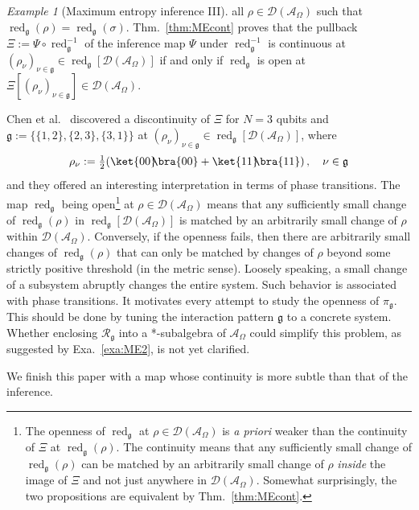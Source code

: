 \documentclass[a4paper,11pt,reqno]{amsart}
\newcommand{\cA}{\mathcal{A}}
\newcommand{\cD}{\mathcal{D}}
\newcommand{\cR}{\mathcal{R}}
\newcommand{\fg}{\mathfrak{g}}
\DeclareMathOperator\red{red}
\theoremstyle{definition}
\theoremstyle{remark}
\newtheorem{exa}[thm]{Example}
\numberwithin{equation}{section}
\begin{document}
\begin{exa}[Maximum entropy inference III]
all $\rho\in\cD(\cA_\Omega)$ such that $\red_\fg(\rho)=\red_\fg(\sigma)$. 
Thm.~\ref{thm:MEcont} proves that the pullback $\Xi:=\Psi\circ\red_\fg^{-1}$ 
of the inference map $\Psi$ under $\red_\fg^{-1}$ is continuous at 
$(\rho_\nu)_{\nu\in\fg}\in\red_\fg[\cD(\cA_\Omega)]$ if and only if 
$\red_\fg$ is open at $\Xi[(\rho_\nu)_{\nu\in\fg}]\in\cD(\cA_\Omega)$.
\par
%
Chen et al.~\cite[Ex.~4]{Chen-etal2015} discovered a discontinuity of $\Xi$ 
for $N=3$ qubits and $\fg:=\{\{1,2\},\{2,3\},\{3,1\}\}$ at 
$(\rho_\nu)_{\nu\in\fg}\in\red_\fg[\cD(\cA_\Omega)]$, where 
\[\textstyle
\rho_\nu:=\frac{1}{2}(\ket{00}\!\!\bra{00}+\ket{11}\!\!\bra{11})\,,
\quad 
\nu\in\fg
\]
and they offered an interesting interpretation in terms of phase transitions. 
The map $\red_\fg$ being open\footnote{%
%
The openness of $\red_\fg$ at $\rho\in\cD(\cA_\Omega)$ is \emph{a priori} 
weaker than the continuity of $\Xi$ at $\red_\fg(\rho)$. The 
continuity means that any sufficiently small change of $\red_\fg(\rho)$ 
can be matched by an arbitrarily small change of $\rho$ \emph{inside} the 
image of $\Xi$ and not just anywhere in $\cD(\cA_\Omega)$. 
Somewhat surprisingly, the two propositions are equivalent by 
Thm.~\ref{thm:MEcont}.}
%
at $\rho\in\cD(\cA_\Omega)$ means that any sufficiently small change of 
$\red_\fg(\rho)$ in $\red_\fg[\cD(\cA_\Omega)]$ is matched by an 
arbitrarily small change of $\rho$ within $\cD(\cA_\Omega)$. Conversely, 
if the openness fails, then there are arbitrarily small changes of 
$\red_\fg(\rho)$ that can only be matched by changes of $\rho$ beyond 
some strictly positive threshold (in the metric sense). Loosely speaking, 
a small change of a subsystem abruptly changes the entire system. Such 
behavior is associated with phase transitions. It motivates every attempt 
to study the openness of $\pi_\fg$. This should be done by tuning the 
interaction pattern $\fg$ to a concrete system. Whether enclosing 
$\cR_\fg$ into a *-subalgebra of $\cA_\Omega$ could simplify this 
problem, as suggested by Exa.~\ref{exa:ME2}, is not yet clarified.
\end{exa}
%
We finish this paper with a map whose continuity is more subtle than 
that of the inference.
\par
%
\end{document}
